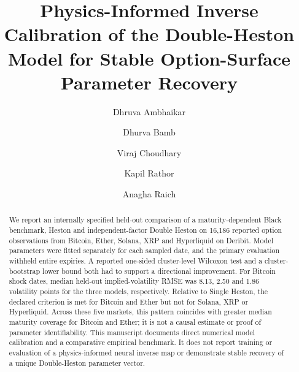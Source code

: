 \documentclass[runningheads]{llncs}
\begin{document}
\title{Physics-Informed Inverse Calibration of the Double-Heston Model
for Stable Option-Surface Parameter Recovery}


\author{%
Dhruva Ambhaikar \and
Dhurva Bamb \and
Viraj Choudhary \and
Kapil Rathor \and
Anagha Raich}



\maketitle

\begin{abstract}
We report an internally specified held-out comparison of a
maturity-dependent Black benchmark, Heston and independent-factor
Double Heston on 16,186 reported option observations from Bitcoin,
Ether, Solana, XRP and Hyperliquid on Deribit. Model parameters were
fitted separately for each sampled date, and the primary evaluation
withheld entire expiries. A reported one-sided cluster-level Wilcoxon
test and a cluster-bootstrap lower bound both had to support a
directional improvement. For Bitcoin shock dates, median held-out
implied-volatility RMSE was 8.13, 2.50 and 1.86 volatility points for
the three models, respectively. Relative to Single Heston, the declared
criterion is met for Bitcoin and Ether but not for Solana, XRP or
Hyperliquid. Across these five markets, this pattern coincides with
greater median maturity coverage for Bitcoin and Ether; it is not a
causal estimate or proof of parameter identifiability. This manuscript
documents direct numerical model calibration and a comparative
empirical benchmark. It does not report training or evaluation of a
physics-informed neural inverse map or demonstrate stable recovery of a
unique Double-Heston parameter vector.

\end{abstract}
\end{document}
